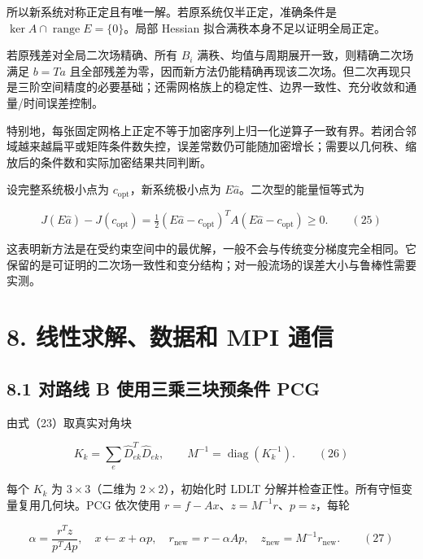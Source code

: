 \documentclass[
  11pt,
  a4paper,
]{article}
\begin{document}
所以新系统对称正定且有唯一解。若原系统仅半正定，准确条件是
\(\ker A\cap\operatorname{range}E=\{0\}\)。局部 Hessian
拟合满秩本身不足以证明全局正定。

若原残差对全局二次场精确、所有 \(B_i\)
满秩、均值与周期展开一致，则精确二次场满足 \(b=Ta\)
且全部残差为零，因而新方法仍能精确再现该二次场。但二次再现只是三阶空间精度的必要基础；还需网格族上的稳定性、边界一致性、充分收敛和通量/时间误差控制。

特别地，每张固定网格上正定不等于加密序列上归一化逆算子一致有界。若闭合邻域越来越扁平或矩阵条件数失控，误差常数仍可能随加密增长；需要以几何秩、缩放后的条件数和实际加密结果共同判断。

设完整系统极小点为 \(c_{\mathrm{opt}}\)，新系统极小点为
\(E\widehat a\)。二次型的能量恒等式为

\[
J(E\widehat a)-J(c_{\mathrm{opt}})
=\tfrac12(E\widehat a-c_{\mathrm{opt}})^TA(E\widehat a-c_{\mathrm{opt}})\ge0. \qquad(25)
\]

这表明新方法是在受约束空间中的最优解，一般不会与传统变分梯度完全相同。它保留的是可证明的二次场一致性和变分结构；对一般流场的误差大小与鲁棒性需要实测。

\hypertarget{ux7ebfux6027ux6c42ux89e3ux6570ux636eux548c-mpi-ux901aux4fe1}{%
\section{8. 线性求解、数据和 MPI
通信}\label{ux7ebfux6027ux6c42ux89e3ux6570ux636eux548c-mpi-ux901aux4fe1}}

\hypertarget{ux5bf9ux8defux7ebf-b-ux4f7fux7528ux4e09ux4e58ux4e09ux5757ux9884ux6761ux4ef6-pcg}{%
\subsection{8.1 对路线 B 使用三乘三块预条件
PCG}\label{ux5bf9ux8defux7ebf-b-ux4f7fux7528ux4e09ux4e58ux4e09ux5757ux9884ux6761ux4ef6-pcg}}

由式（23）取真实对角块

\[
K_k=\sum_e\widehat D_{ek}^T\widehat D_{ek},\qquad
M^{-1}=\operatorname{diag}(K_k^{-1}). \qquad(26)
\]

每个 \(K_k\) 为 \(3\times3\)（二维为 \(2\times2\)），初始化时 LDLT
分解并检查正性。所有守恒变量复用几何块。PCG 依次使用
\(r=f-Ax\)、\(z=M^{-1}r\)、\(p=z\)，每轮

\[
\alpha=\frac{r^Tz}{p^TAp},\quad x\leftarrow x+\alpha p,
\quad r_{\mathrm{new}}=r-\alpha Ap,\quad z_{\mathrm{new}}=M^{-1}r_{\mathrm{new}}. \qquad(27)
\]
\end{document}
